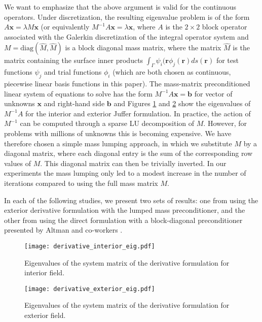 We want to emphasize that the above argument is valid for the continuous operators. Under discretization, the resulting eigenvalue problem is of the form $A\mathbf{x}=\lambda M\mathbf{x}$ (or equivalently $M^{-1}A\mathbf{x}=\lambda \mathbf{x}$, where $A$ is the $2\times 2$ block operator associated with the Galerkin discretization of the integral operator system and $M = \text{diag}(\hat{M}, \hat{M})$ is a block diagonal mass matrix, where the matrix $\hat{M}$ is the matrix containing the surface inner products $\int_{\Gamma}\psi_i(\mathbf{r}\phi_j(\mathbf{r})ds(\mathbf{r})$ for test functions $\psi_j$ and trial functions $\phi_i$ (which are both chosen as continuous, piecewise linear basis functions in this paper). The mass-matrix preconditioned linear system of equations to solve has the form $M^{-1}A\mathbf{x} = \mathbf{b}$ for vector of unknowns $\mathbf{x}$ and right-hand side $\mathbf{b}$ and Figures \ref{fig:derivative_interior_eig} and \ref{fig:derivative_exterior_eig} show the eigenvalues of $M^{-1}A$ for the interior and exterior Juffer formulation. In practice, the action of $M^{-1}$ can be computed through a sparse LU decomposition of $M$. However, for problems with millions of unknowns this is becoming expensive. We have therefore chosen a simple mass lumping approach, in which we substitute $M$ by a diagonal matrix, where each diagonal entry is the sum of the corresponding row values of $M$. This diagonal matrix can then be trivially inverted. In our experiments the mass lumping only led to a modest increase in the number of iterations compared to using the full mass matrix $M$.

In each of the following studies, we present two sets of results: one from using the exterior derivative formulation with the lumped mass preconditioner, and the other from using the direct formulation with a block-diagonal preconditioner presented by Altman and co-workers \cite{AltmanBardhanWhiteTidor2009}.

\begin{figure}%
    \centering
    \texttt{[image: derivative\_interior\_eig.pdf]}
    \caption{Eigenvalues of the system matrix of the derivative formulation for interior field.}
    \label{fig:derivative_interior_eig}
\end{figure}

\begin{figure}%
    \centering
    \texttt{[image: derivative\_exterior\_eig.pdf]}
    \caption{Eigenvalues of the system matrix of the derivative formulation for exterior field.}
    \label{fig:derivative_exterior_eig}
\end{figure}

